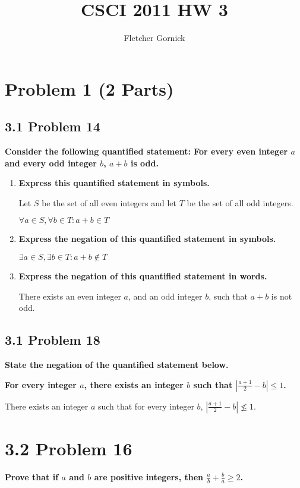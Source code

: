 \documentclass[10pt]{article}
\title{CSCI 2011 HW 3}
\author{Fletcher Gornick}
\def \n {\par \vspace{\baselineskip}}
\begin{document}
\maketitle

\section{Problem 1 (2 Parts)}
\subsection{3.1 Problem 14}
\textbf{Consider the following quantified statement: For every even integer $a$ and every odd integer
$b$, $a + b$ is odd.}

\begin{enumerate}[label=(\alph*)]
    
    \item \textbf{Express this quantified statement in symbols.}

        Let $S$ be the set of all even integers and let $T$ be the set of all odd integers.

        $\forall a \in S, \forall b \in T: a+b \in T$


    \item \textbf{Express the negation of this quantified statement in symbols.}

        $\exists a \in S, \exists b \in T: a+b \not\in T$
        

    \item \textbf{Express the negation of this quantified statement in words.}

        There exists an even integer $a$, and an odd integer $b$, such that $a+b$ is not odd.


\end{enumerate}



\subsection{3.1 Problem 18}
\textbf{State the negation of the quantified statement below.}

\textbf{For every integer $a$, there exists an integer $b$ such that $|\frac{a+1}{2} - b| \leq 1$.}

\n
There exists an integer $a$ such that for every integer $b$, $|\frac{a+1}{2} - b| \nleq 1$.


\section{3.2 Problem 16}
\textbf{Prove that if $a$ and $b$ are positive integers, then $\frac{a}{b} + \frac{b}{a} \geq 2$.}
\end{document}
